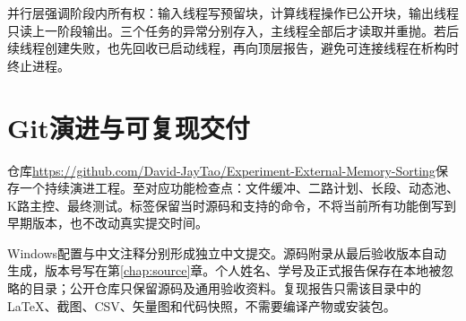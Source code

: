 并行层强调阶段内所有权：输入线程写预留块，计算线程操作已公开块，输出线程只读上一阶段输出。三个任务的异常分别存入，主线程全部后才读取并重抛。若后续线程创建失败，也先回收已启动线程，再向顶层报告，避免可连接线程在析构时终止进程。

\section{Git演进与可复现交付}
仓库\url{https://github.com/David-JayTao/Experiment-External-Memory-Sorting}保存一个持续演进工程。至对应功能检查点：文件缓冲、二路计划、长段、动态池、K路主控、最终测试。标签保留当时源码和支持的命令，不将当前所有功能倒写到早期版本，也不改动真实提交时间。

Windows配置与中文注释分别形成独立中文提交。源码附录从最后验收版本自动生成，版本号写在第\ref{chap:source}章。个人姓名、学号及正式报告保存在本地被忽略的目录；公开仓库只保留源码及通用验收资料。复现报告只需该目录中的LaTeX、截图、CSV、矢量图和代码快照，不需要编译产物或安装包。

